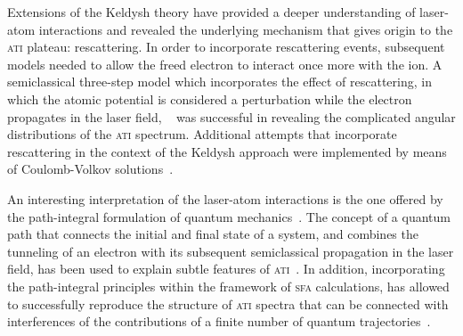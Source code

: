 Extensions of the Keldysh theory have provided a deeper understanding
of laser-atom interactions and revealed the underlying mechanism that
gives origin to the \textsc{ati} plateau: rescattering. In order to
incorporate rescattering events, subsequent models needed to allow the
freed electron to interact once more with the ion. A semiclassical
three-step model which incorporates the effect of rescattering, in
which the atomic potential is considered a perturbation while the
electron propagates in the laser field,
~\cite{Becker_rescattering1994,Becker_1994plateau_classical} was
successful in revealing the complicated angular distributions of the
\textsc{ati} spectrum. Additional attempts that incorporate
rescattering in the context of the Keldysh approach were implemented
by means of Coulomb-Volkov solutions~\cite{Kaminski_1997}.


An interesting interpretation of the laser-atom interactions is the
one offered by the path-integral formulation of quantum
mechanics~\cite{RevModPhysFeynman}. The concept of a quantum path that
connects the initial and final state of a system, and combines the
tunneling of an electron with its subsequent semiclassical propagation
in the laser field, has been used to explain subtle features of
\textsc{ati}~\cite{LewScience2001}. In addition, incorporating the
path-integral principles within the framework of \textsc{sfa}
calculations, has allowed to successfully reproduce the structure of
\textsc{ati} spectra that can be connected with interferences of the
contributions of a finite number of quantum
trajectories~\cite{KopoldOptComm2000}.



